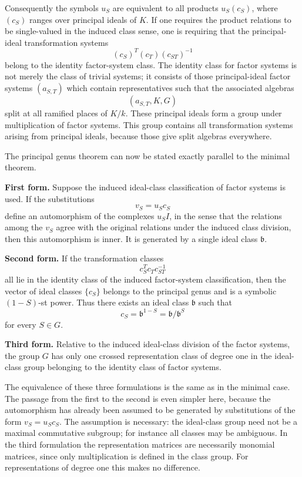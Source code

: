 \documentclass[11pt]{article}
\begin{document}
Consequently the symbols \(u_S\) are equivalent to all products \(u_S(c_S)\), where \((c_S)\) ranges over principal ideals of \(K\). If one requires the product relations to be single-valued in the induced class sense, one is requiring that the principal-ideal transformation systems
\[
  (c_S)^T(c_T)(c_{ST})^{-1}
\]
belong to the identity factor-system class. The identity class for factor systems is not merely the class of trivial systems; it consists of those principal-ideal factor systems \((a_{S,T})\) which contain representatives such that the associated algebras
\[
  (a_{S,T},K,G)
\]
split at all ramified places of \(K/k\). These principal ideals form a group under multiplication of factor systems. This group contains all transformation systems arising from principal ideals, because those give split algebras everywhere.

The principal genus theorem can now be stated exactly parallel to the minimal theorem.

\textbf{First form.} Suppose the induced ideal-class classification of factor systems is used. If the substitutions
\[
  v_S=u_S c_S
\]
define an automorphism of the complexes \(u_S I\), in the sense that the relations among the \(v_S\) agree with the original relations under the induced class division, then this automorphism is inner. It is generated by a single ideal class \(\mathfrak b\).

\textbf{Second form.} If the transformation classes
\[
  c_S^T c_T c_{ST}^{-1}
\]
all lie in the identity class of the induced factor-system classification, then the vector of ideal classes \(\{c_S\}\) belongs to the principal genus and is a symbolic \((1-S)\)-st power. Thus there exists an ideal class \(\mathfrak b\) such that
\[
  c_S=\mathfrak b^{1-S}=\mathfrak b/\mathfrak b^S
\]
for every \(S\in G\).

\textbf{Third form.} Relative to the induced ideal-class division of the factor systems, the group \(G\) has only one crossed representation class of degree one in the ideal-class group belonging to the identity class of factor systems.

The equivalence of these three formulations is the same as in the minimal case. The passage from the first to the second is even simpler here, because the automorphism has already been assumed to be generated by substitutions of the form \(v_S=u_Sc_S\). The assumption is necessary: the ideal-class group need not be a maximal commutative subgroup; for instance all classes may be ambiguous. In the third formulation the representation matrices are necessarily monomial matrices, since only multiplication is defined in the class group. For representations of degree one this makes no difference.
\end{document}
